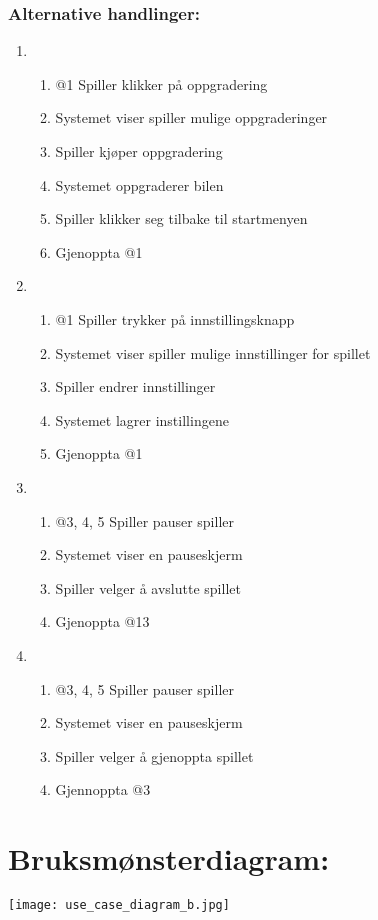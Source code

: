 \documentclass[12pt]{report}
\begin{document}
\subsubsection*{Alternative handlinger:}
\begin{enumerate}[label=\Alph*]
\item 
\bigskip
\begin{enumerate}
\item @1 Spiller klikker på oppgradering
\item Systemet viser spiller mulige oppgraderinger 
\item Spiller kjøper oppgradering
\item Systemet oppgraderer bilen
\item Spiller klikker seg tilbake til startmenyen
\item Gjenoppta @1
\end{enumerate}
\item 
\bigskip
\begin{enumerate}
\item @1 Spiller trykker på innstillingsknapp
\item Systemet viser spiller mulige innstillinger for spillet
\item Spiller endrer innstillinger
\item Systemet lagrer instillingene
\item Gjenoppta @1
\end{enumerate}
\item
\bigskip
\begin{enumerate}
\item @3, 4, 5 Spiller pauser spiller
\item Systemet viser en pauseskjerm
\item Spiller velger å avslutte spillet
\item Gjenoppta @13
\end{enumerate}
\item
\bigskip
\begin{enumerate}
\item @3, 4, 5 Spiller pauser spiller
\item Systemet viser en pauseskjerm
\item Spiller velger å gjenoppta spillet
\item Gjennoppta @3
\end{enumerate}
\end{enumerate}
\pagebreak
\section*{Bruksmønsterdiagram:}
\vspace{4cm}
\texttt{[image: use\_case\_diagram\_b.jpg]}
\end{document}
